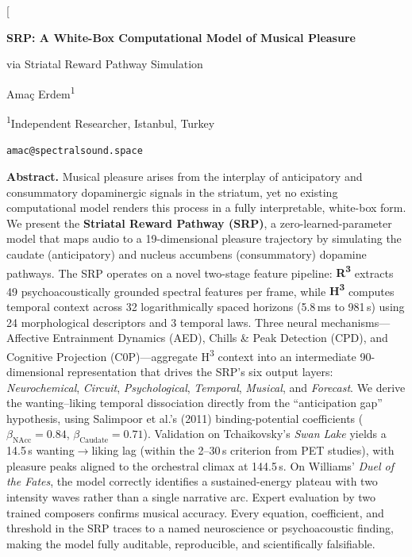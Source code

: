 \documentclass[10pt,twocolumn]{article}
\newcommand{\Rtri}{R\textsuperscript{3}}
\newcommand{\Htri}{H\textsuperscript{3}}
\begin{document}
\twocolumn[
\centering
{\LARGE\bfseries SRP: A White-Box Computational Model of Musical Pleasure\par
\vspace{3pt}
via Striatal Reward Pathway Simulation\par}
\vspace{12pt}
{\large Ama\c{c} Erdem\textsuperscript{1}\par}
\vspace{6pt}
{\small \textsuperscript{1}Independent Researcher, Istanbul, Turkey\par}
\vspace{4pt}
{\small\texttt{amac@spectralsound.space}\par}
\vspace{14pt}
\begin{minipage}{0.92\textwidth}
\noindent\textbf{Abstract.}
Musical pleasure arises from the interplay of anticipatory and consummatory dopaminergic signals in the striatum, yet no existing computational model renders this process in a fully interpretable, white-box form. We present the \textbf{Striatal Reward Pathway (SRP)}, a zero-learned-parameter model that maps audio to a 19-dimensional pleasure trajectory by simulating the caudate (anticipatory) and nucleus accumbens (consummatory) dopamine pathways. The SRP operates on a novel two-stage feature pipeline: \textbf{\Rtri{}} extracts 49 psychoacoustically grounded spectral features per frame, while \textbf{\Htri{}} computes temporal context across 32 logarithmically spaced horizons (5.8\,ms to 981\,s) using 24 morphological descriptors and 3 temporal laws. Three neural mechanisms---Affective Entrainment Dynamics (AED), Chills \& Peak Detection (CPD), and Cognitive Projection (C0P)---aggregate \Htri{} context into an intermediate 90-dimensional representation that drives the SRP's six output layers: \textit{Neurochemical}, \textit{Circuit}, \textit{Psychological}, \textit{Temporal}, \textit{Musical}, and \textit{Forecast}. We derive the wanting--liking temporal dissociation directly from the ``anticipation gap'' hypothesis, using Salimpoor et al.'s (2011) binding-potential coefficients ($\beta_\text{NAcc}=0.84$, $\beta_\text{Caudate}=0.71$). Validation on Tchaikovsky's \textit{Swan Lake} yields a 14.5\,s wanting$\to$liking lag (within the 2--30\,s criterion from PET studies), with pleasure peaks aligned to the orchestral climax at 144.5\,s. On Williams' \textit{Duel of the Fates}, the model correctly identifies a sustained-energy plateau with two intensity waves rather than a single narrative arc. Expert evaluation by two trained composers confirms musical accuracy. Every equation, coefficient, and threshold in the SRP traces to a named neuroscience or psychoacoustic finding, making the model fully auditable, reproducible, and scientifically falsifiable.
\end{minipage}
\end{document}
